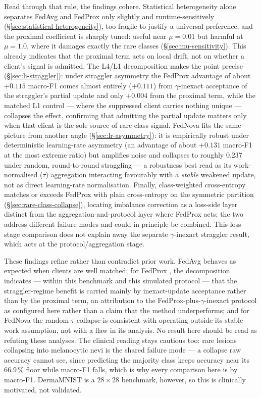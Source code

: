 \documentclass[11pt,a4paper]{report}
\begin{document}
Read through that rule, the findings cohere. Statistical heterogeneity alone
separates FedAvg and FedProx only slightly and runtime-sensitively
(\S\ref{sec:statistical-heterogeneity}), too fragile to justify a universal
preference, and the proximal coefficient is sharply tuned: useful near
$\mu = 0.01$ but harmful at $\mu = 1.0$, where it damages exactly the rare classes
(\S\ref{sec:mu-sensitivity}). This already indicates that the proximal term acts
on local drift, not on whether a client's signal is admitted. The L4/L1
decomposition makes the point precise (\S\ref{sec:li-straggler}): under straggler
asymmetry the FedProx advantage of about $+0.115$ macro-F1 comes almost entirely
($+0.111$) from $\gamma$-inexact acceptance of the straggler's partial update and
only $+0.004$ from the proximal term, while the matched L1 control --- where the
suppressed client carries nothing unique --- collapses the effect, confirming that
admitting the partial update matters only when that client is the sole source of
rare-class signal. FedNova fits the same picture from another angle
(\S\ref{sec:lr-asymmetry}): it is empirically robust under deterministic
learning-rate asymmetry (an advantage of about $+0.131$ macro-F1 at the most
extreme ratio) but amplifies noise and collapses to roughly $0.237$ under random,
round-to-round straggling --- a robustness best read as its work-normalised
($\tau$) aggregation interacting favourably with a \emph{stable} weakened update,
not as direct learning-rate normalisation. Finally, class-weighted
cross-entropy matches or exceeds FedProx with plain cross-entropy on the symmetric
partition (\S\ref{sec:rare-class-collapse}), locating imbalance correction as a
loss-side layer distinct from the aggregation-and-protocol layer where FedProx
acts; the two address different failure modes and could in principle be combined.
This loss-stage comparison does not explain away the separate $\gamma$-inexact
straggler result, which acts at the protocol/aggregation stage.

These findings refine rather than contradict prior work. FedAvg
\citep{mcmahan2017fedavg} behaves as expected when clients are well matched; for
FedProx \citep{li2020fedprox}, the decomposition indicates --- within this
benchmark and this simulated protocol --- that the straggler-regime benefit is
carried mainly by inexact-update acceptance rather than by the proximal term, an
attribution to the FedProx-plus-$\gamma$-inexact protocol as configured here
rather than a claim that the method underperforms; and for FedNova
\citep{wang2020fednova} the random-$\tau$ collapse is consistent with operating
outside its stable-work assumption, not with a flaw in its analysis. No result
here should be read as refuting these analyses. The clinical reading stays
cautious too: rare lesions collapsing into melanocytic nevi is the shared failure
mode --- a collapse raw accuracy cannot see, since predicting the majority class
keeps accuracy near its $66.9\,\%$ floor while macro-F1 falls, which is why every
comparison here is by macro-F1. DermaMNIST is a $28 \times 28$ benchmark, however,
so this is clinically motivated, not validated.
\end{document}
